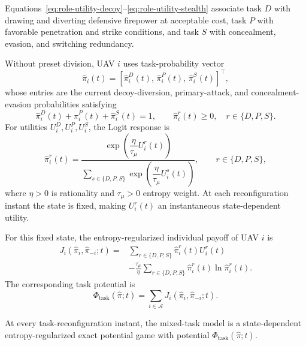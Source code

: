 \documentclass[unbranded]{cja}
\begin{document}
Equations~\eqref{eq:role-utility-decoy}--\eqref{eq:role-utility-stealth} associate task $D$ with drawing and diverting defensive firepower at acceptable cost, task $P$ with favorable penetration and strike conditions, and task $S$ with concealment, evasion, and switching redundancy.

Without preset division, UAV $i$ uses task-probability vector
\begin{equation}
\hat{\pi}_i(t)=
\left[
\hat{\pi}_i^{D}(t),\,
\hat{\pi}_i^{P}(t),\,
\hat{\pi}_i^{S}(t)
\right]^{\top},
\end{equation}
whose entries are the current decoy-diversion, primary-attack, and concealment-evasion probabilities satisfying
\begin{equation}
\hat{\pi}_i^{D}(t)+\hat{\pi}_i^{P}(t)+\hat{\pi}_i^{S}(t)=1,\qquad
\hat{\pi}_i^{r}(t)\ge 0,\quad r\in\{D,P,S\}.
\end{equation}
For utilities $U_i^{D},U_i^{P},U_i^{S}$, the Logit response is
\begin{equation}
\hat{\pi}_i^{r}(t)
=
\frac{\exp\!\left(\dfrac{\eta}{\tau_\mu}U_i^{r}(t)\right)}
{\sum\limits_{s\in\{D,P,S\}}\exp\!\left(\dfrac{\eta}{\tau_\mu}U_i^{s}(t)\right)},
\qquad r\in\{D,P,S\},
\label{eq:role-logit}
\end{equation}
where $\eta>0$ is rationality and $\tau_\mu>0$ entropy weight. At each reconfiguration instant the state is fixed, making $U_i^r(t)$ an instantaneous state-dependent utility.

For this fixed state, the entropy-regularized individual payoff of UAV $i$ is
\begin{equation}
\begin{aligned}
J_i(\hat{\pi}_i,\hat{\pi}_{-i};t)
={}&
\sum_{r\in\{D,P,S\}}\hat{\pi}_i^r(t)U_i^r(t)\\
&-\frac{\tau_\mu}{\eta}
\sum_{r\in\{D,P,S\}}\hat{\pi}_i^r(t)\ln\hat{\pi}_i^r(t).
\end{aligned}
\end{equation}
The corresponding task potential is
\begin{equation}
\Phi_{\mathrm{task}}(\hat{\pi};t)
=
\sum_{i\in\mathcal A}J_i(\hat{\pi}_i,\hat{\pi}_{-i};t).
\end{equation}

At every task-reconfiguration instant, the mixed-task model is a state-dependent entropy-regularized exact potential game with potential $\Phi_{\mathrm{task}}(\hat{\pi};t)$.
\end{document}
